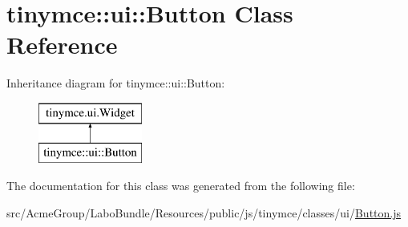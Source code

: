 \hypertarget{classtinymce_1_1ui_1_1_button}{\section{tinymce\+:\+:ui\+:\+:Button Class Reference}
\label{classtinymce_1_1ui_1_1_button}
}
Inheritance diagram for tinymce\+:\+:ui\+:\+:Button\+:\begin{figure}[H]
\begin{center}
\leavevmode
\includegraphics[height=2.000000cm]{classtinymce_1_1ui_1_1_button}
\end{center}
\end{figure}


The documentation for this class was generated from the following file\+:\begin{DoxyCompactItemize}
\item 
src/\+Acme\+Group/\+Labo\+Bundle/\+Resources/public/js/tinymce/classes/ui/\hyperlink{_button_8js}{Button.\+js}\end{DoxyCompactItemize}
